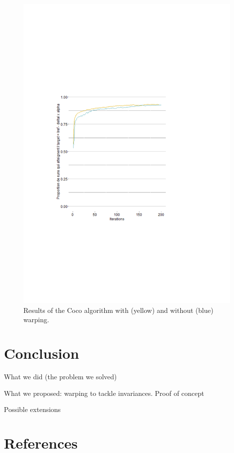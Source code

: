 \begin{figure}[!ht]
	\centering
	\includegraphics[trim = 2cm 7cm 6cm 8cm, clip]{Figures_Warping_resultats_courbes_algoCoco.pdf}
	\caption{Results of the Coco algorithm with (yellow) and without (blue) warping.}\label{fig:algococo}
\end{figure}

\section{Conclusion}

What we did (the problem we solved)

What we proposed: warping to tackle invariances. Proof of concept

Possible extensions

\section*{References}
